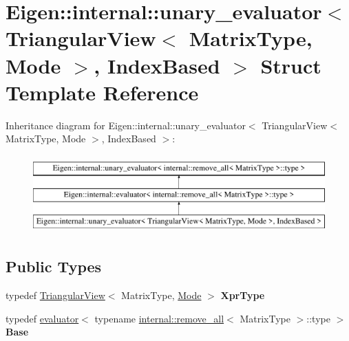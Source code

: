 \hypertarget{struct_eigen_1_1internal_1_1unary__evaluator_3_01_triangular_view_3_01_matrix_type_00_01_mode_01_4_00_01_index_based_01_4}{}\section{Eigen\+::internal\+::unary\+\_\+evaluator$<$ Triangular\+View$<$ Matrix\+Type, Mode $>$, Index\+Based $>$ Struct Template Reference}
\label{struct_eigen_1_1internal_1_1unary__evaluator_3_01_triangular_view_3_01_matrix_type_00_01_mode_01_4_00_01_index_based_01_4}
Inheritance diagram for Eigen\+::internal\+::unary\+\_\+evaluator$<$ Triangular\+View$<$ Matrix\+Type, Mode $>$, Index\+Based $>$\+:\begin{figure}[H]
\begin{center}
\leavevmode
\includegraphics[height=3.000000cm]{struct_eigen_1_1internal_1_1unary__evaluator_3_01_triangular_view_3_01_matrix_type_00_01_mode_01_4_00_01_index_based_01_4}
\end{center}
\end{figure}
\subsection*{Public Types}
\begin{DoxyCompactItemize}
\item 
\mbox{\label{struct_eigen_1_1internal_1_1unary__evaluator_3_01_triangular_view_3_01_matrix_type_00_01_mode_01_4_00_01_index_based_01_4_a87825ad5799553ca3c40591899488f89}} 
typedef \mbox{\hyperlink{class_eigen_1_1_triangular_view}{Triangular\+View}}$<$ Matrix\+Type, \mbox{\hyperlink{struct_mode}{Mode}} $>$ {\bfseries Xpr\+Type}
\item 
\mbox{\label{struct_eigen_1_1internal_1_1unary__evaluator_3_01_triangular_view_3_01_matrix_type_00_01_mode_01_4_00_01_index_based_01_4_a3a7729a020a83f999d535d7cc1273164}} 
typedef \mbox{\hyperlink{struct_eigen_1_1internal_1_1evaluator}{evaluator}}$<$ typename \mbox{\hyperlink{struct_eigen_1_1internal_1_1remove__all}{internal\+::remove\+\_\+all}}$<$ Matrix\+Type $>$\+::type $>$ {\bfseries Base}
\end{DoxyCompactItemize}
